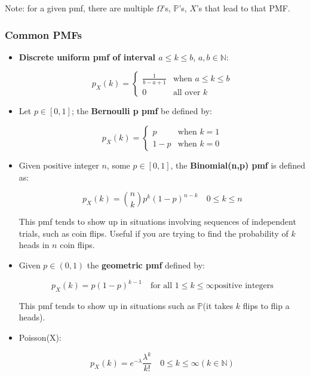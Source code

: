 \documentclass{article}
\begin{document}
Note: for a given pmf, there are multiple $\Omega$'s, $\mathbb{P}$'s,
$X$'s that lead to that PMF.

\subsubsection{Common PMFs}

\begin{itemize}
\item \textbf{Discrete uniform pmf of interval $a \leq k \leq b$},
  $a, b \in \mathbb{N}$:
  
  \[
    p_X(k) =
    \begin{cases}
      \frac{1}{b - a + 1} & \text{when } a \leq k \leq b \\
      0 & \text{all over } k
    \end{cases}
  \]

\item Let $p \in [0,1]$; the \textbf{Bernoulli p pmf} be defined by:
  
  \[
    p_X(k) =
    \begin{cases}
      p & \text{when } k = 1 \\
      1 - p & \text{when } k = 0
    \end{cases}
  \]
    
\item Given positive integer $n$, some $p \in [0,1]$, the
  \textbf{Binomial(n,p) pmf} is defined as:

  \[
    p_X(k) = {n \choose k} p^k (1 - p)^{n-k} \quad 0 \leq k \leq n
  \]

  This pmf tends to show up in situations involving sequences of
  independent trials, such as coin flips. Useful if you are trying to
  find the probability of $k$ heads in $n$ coin flips.

\item Given $p \in (0, 1)$ the \textbf{geometric pmf} defined by:

  \[
    p_X(k) = p (1-p)^{k-1} \quad \text{for all } 1 \leq k \leq \infty
    \text{positive integers}
  \]

  This pmf tends to show up in situations such as $\mathbb{P}$(it
  takes $k$ flips to flip a heads).

\item Poisson(X):

  \[
    p_X(k) = e^{-\lambda} \frac{\lambda^{k}}{k!} \quad 0 \leq k \leq
    \infty (k \in \mathbb{N})
  \]
\end{itemize}
\end{document}
